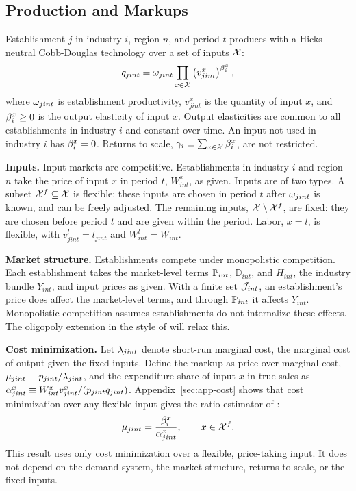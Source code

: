 \subsection{Production and Markups}\label{sec:production}

Establishment $j$ in industry $i$, region $n$, and period $t$ produces with a Hicks-neutral Cobb-Douglas technology over a set of inputs $\cX$:
\begin{equation}\label{eq:prodfn}
	q_{jint} = \o_{jint} \prod_{x \in \cX} \left(v^x_{jint}\right)^{\b^x_i},
\end{equation}
where $\o_{jint}$ is establishment productivity, $v^x_{jint}$ is the quantity of input $x$, and $\b^x_i \geq 0$ is the output elasticity of input $x$.
Output elasticities are common to all establishments in industry $i$ and constant over time.
An input not used in industry $i$ has $\b^x_i = 0$.
Returns to scale, $\g_i \equiv \sum_{x \in \cX} \b^x_i$, are not restricted.

\textbf{Inputs.}
Input markets are competitive.
Establishments in industry $i$ and region $n$ take the price of input $x$ in period $t$, $W^x_{int}$, as given.
Inputs are of two types.
A subset $\cX^f \subseteq \cX$ is flexible: these inputs are chosen in period $t$ after $\o_{jint}$ is known, and can be freely adjusted.
The remaining inputs, $\cX \setminus \cX^f$, are fixed: they are chosen before period $t$ and are given within the period.
Labor, $x = l$, is flexible, with $v^l_{jint} = l_{jint}$ and $W^l_{int} = W_{int}$.

\textbf{Market structure.}
Establishments compete under monopolistic competition.
Each establishment takes the market-level terms $\P_{int}$, $\mathbb{D}_{int}$, and $H_{int}$, the industry bundle $Y_{int}$, and input prices as given.
With a finite set $\cJ_{int}$, an establishment's price does affect the market-level terms, and through $\P_{int}$ it affects $Y_{int}$.
Monopolistic competition assumes establishments do not internalize these effects.
The oligopoly extension in the style of \textcite{Atkeson&Burstein08} will relax this.

\textbf{Cost minimization.}
Let $\l_{jint}$ denote short-run marginal cost, the marginal cost of output given the fixed inputs.
Define the markup as price over marginal cost, $\m_{jint} \equiv p_{jint}/\l_{jint}$, and the expenditure share of input $x$ in true sales as $\a^x_{jint} \equiv W^x_{int} v^x_{jint} / (p_{jint} q_{jint})$.
Appendix~\ref{sec:app-cost} shows that cost minimization over any flexible input gives the ratio estimator of \textcite{DeLoecker&Warzynski12}:
\begin{equation}\label{eq:ratio}
	\m_{jint} = \frac{\b^x_i}{\a^x_{jint}}, \qquad x \in \cX^f.
\end{equation}
This result uses only cost minimization over a flexible, price-taking input.
It does not depend on the demand system, the market structure, returns to scale, or the fixed inputs.

